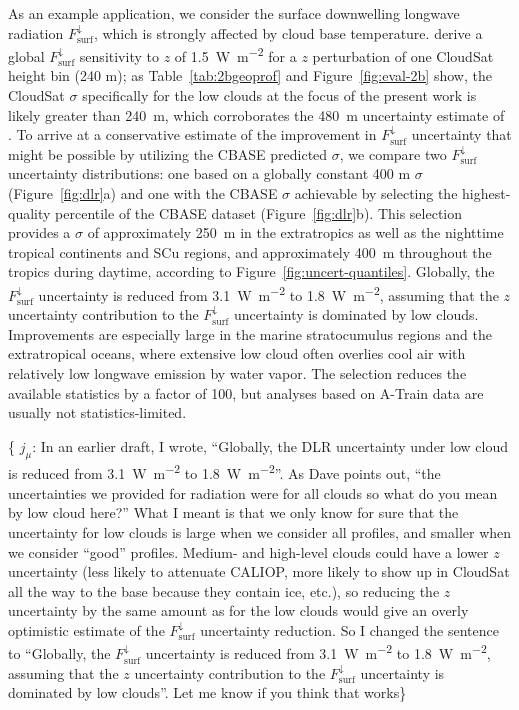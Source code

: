 \documentclass[essd,manuscript]{copernicus}\usepackage[]{graphicx}\usepackage[]{color}
\newcommand{\hlnum}[1]{\textcolor[rgb]{0.686,0.059,0.569}{#1}}%
\newcommand\comment[2]{\{\hlnum{ \textit{#1}: #2}\}}
\newcommand\commentjm[1]{\comment{$j_\mu$}{#1}}
\newcommand\CBH{\ensuremath{z}}
\newcommand\DLR{\ensuremath{F_\text{surf}^\downarrow}}
\begin{document}
As an example application, we consider the surface downwelling longwave
radiation \DLR{}, which is strongly affected by cloud base temperature.
\cite{Henderson2013} derive a global \DLR{} sensitivity to \CBH{} of
1.5~\unit{W~m^{-2}} for a \CBH{} perturbation of one CloudSat height bin (240
m); as Table~\ref{tab:2bgeoprof} and Figure~\ref{fig:eval-2b} show, the CloudSat
$\sigma$ specifically for the low clouds at the focus of the present work is
likely greater than 240~\unit{m}, which corroborates the 480~\unit{m}
uncertainty estimate of \cite{Kato2011}. To arrive at a conservative estimate of
the improvement in \DLR{} uncertainty that might be possible by utilizing the
CBASE predicted $\sigma$, we compare two \DLR{} uncertainty distributions: one
based on a globally constant 400 m $\sigma$ (Figure~\ref{fig:dlr}a) and one with
the CBASE $\sigma$ achievable by selecting the highest-quality percentile of the
CBASE dataset (Figure~\ref{fig:dlr}b). This selection provides a $\sigma$ of
approximately 250~\unit{m} in the extratropics as well as the nighttime tropical
continents and SCu regions, and approximately 400~\unit{m} throughout the
tropics during daytime, according to Figure~\ref{fig:uncert-quantiles}.
Globally, the \DLR{} uncertainty is reduced from 3.1~\unit{W~m^{-2}} to
1.8~\unit{W~m^{-2}}, assuming that the \CBH{} uncertainty contribution to the
\DLR{} uncertainty is dominated by low clouds.  Improvements are especially
large in the marine stratocumulus regions and the extratropical oceans, where
extensive low cloud often overlies cool air with relatively low longwave
emission by water vapor. The selection reduces the available statistics by a
factor of 100, but analyses based on A-Train data are usually not
statistics-limited.

\commentjm{In an earlier draft, I wrote, ``Globally, the DLR uncertainty under
  low cloud is reduced from 3.1~\unit{W~m^{-2}} to 1.8~\unit{W~m^{-2}}''.  As
  Dave points out, ``the uncertainties we provided for radiation were for all
  clouds so what do you mean by low cloud here?''  What I meant is that we only
  know for sure that the uncertainty for low clouds is large when we consider all
  profiles, and smaller when we consider ``good'' profiles.  Medium- and high-level
  clouds could have a lower \CBH{} uncertainty (less likely to attenuate CALIOP, more
  likely to show up in CloudSat all the way to the base because they contain
  ice, etc.), so reducing the \CBH{} uncertainty by the same amount as for the
  low clouds would give an overly optimistic estimate of the \DLR{} uncertainty
  reduction.  So I changed the sentence to ``Globally, the \DLR{} uncertainty
  is reduced from 3.1~\unit{W~m^{-2}} to 1.8~\unit{W~m^{-2}}, assuming that the
  \CBH{} uncertainty contribution to the \DLR{} uncertainty is dominated by low
  clouds''.  Let me know if you think that works}
\end{document}

